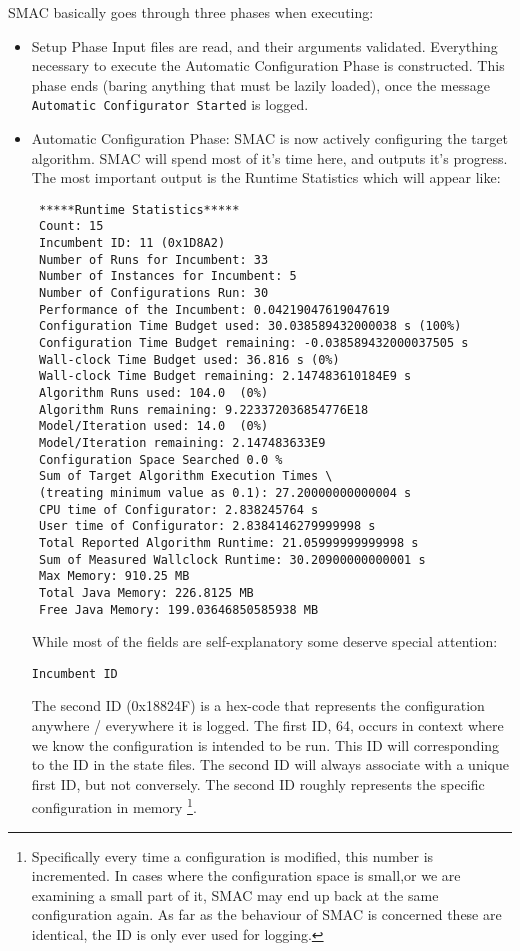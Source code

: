 \documentclass[manual.tex]{subfiles}
\begin{document}
SMAC basically goes through three phases when executing:
\begin{itemize}
\item Setup Phase Input files are read, and their arguments validated. Everything necessary to execute the Automatic Configuration Phase is constructed. This phase ends (baring anything that must be lazily loaded), once the message \texttt{Automatic Configurator Started} is logged.

\item Automatic Configuration Phase: SMAC is now actively configuring the target algorithm. SMAC will spend most of it's time here, and outputs it's progress. The most important output is the Runtime Statistics which will appear like:
\scriptsize{
\begin{verbatim}
 *****Runtime Statistics*****
 Count: 15
 Incumbent ID: 11 (0x1D8A2)
 Number of Runs for Incumbent: 33
 Number of Instances for Incumbent: 5
 Number of Configurations Run: 30
 Performance of the Incumbent: 0.04219047619047619
 Configuration Time Budget used: 30.038589432000038 s (100%)
 Configuration Time Budget remaining: -0.038589432000037505 s
 Wall-clock Time Budget used: 36.816 s (0%)
 Wall-clock Time Budget remaining: 2.147483610184E9 s
 Algorithm Runs used: 104.0  (0%)
 Algorithm Runs remaining: 9.223372036854776E18 
 Model/Iteration used: 14.0  (0%)
 Model/Iteration remaining: 2.147483633E9 
 Configuration Space Searched 0.0 % 
 Sum of Target Algorithm Execution Times \
 (treating minimum value as 0.1): 27.20000000000004 s
 CPU time of Configurator: 2.838245764 s
 User time of Configurator: 2.8384146279999998 s
 Total Reported Algorithm Runtime: 21.05999999999998 s
 Sum of Measured Wallclock Runtime: 30.20900000000001 s
 Max Memory: 910.25 MB
 Total Java Memory: 226.8125 MB
 Free Java Memory: 199.03646850585938 MB
\end{verbatim}
}

\normalsize
While most of the fields are self-explanatory some deserve special attention:


\texttt{Incumbent ID}

The second ID (0x18824F) is a hex-code that represents the configuration anywhere / everywhere it is logged. The first ID, 64, occurs in context where we know the configuration is intended to be run. This ID will corresponding to the ID in the state files. The second ID will always associate with a unique first ID, but not conversely. The second ID roughly represents the specific configuration in memory \footnote{Specifically every time a configuration is modified, this number is incremented. In cases where the configuration space is small,or we are examining a small part of it, SMAC may end up back at the same configuration again. As far as the behaviour of SMAC is concerned these are identical, the ID is only ever used for logging.}.


\end{itemize}
\end{document}
